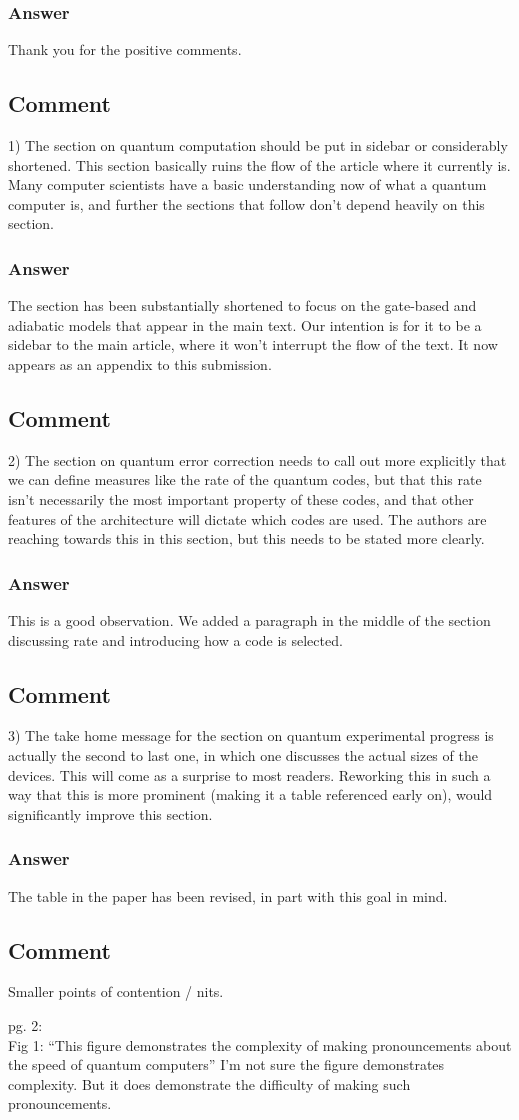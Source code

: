 \documentclass{article}
\newcommand{\comment}{\subsection{Comment}\em}
\newcommand{\answer}{\rm \subsubsection*{Answer}}
\begin{document}
\answer

Thank you for the positive comments.

\comment

1) The section on quantum computation should be put in sidebar or
considerably shortened.  This section basically ruins the flow of the
article where it currently is.  Many computer scientists have a basic
understanding now of what a quantum computer is, and further the
sections that follow don't depend heavily on this section.

\answer

The section has been substantially shortened to focus on the
gate-based and adiabatic models that appear in the main text.  Our
intention is for it to be a sidebar to the main article, where it
won't interrupt the flow of the text.  It now appears as an appendix
to this submission.

\comment

2) The section on quantum error correction needs to call out more
explicitly that we can define measures like the rate of the quantum
codes, but that this rate isn't necessarily the most important
property of these codes, and that other features of the architecture
will dictate which codes are used.  The authors are reaching towards
this in this section, but this needs to be stated more clearly.

\answer

This is a good observation.  We added a paragraph in the middle of the
section discussing rate and introducing how a code is selected.

\comment

3) The take home message for the section on quantum experimental
progress is actually the second to last one, in which one discusses
the actual sizes of the devices.  This will come as a surprise to most
readers. Reworking this in such a way that this is more prominent
(making it a table referenced early on), would significantly improve
this section.

\answer

The table in the paper has been revised, in part with this goal in
mind.

\comment


Smaller points of contention / nits.

pg. 2:\\
Fig 1: ``This figure demonstrates the complexity of making pronouncements about the speed of quantum computers''
I'm not sure the figure demonstrates complexity.  But it does demonstrate the difficulty of making such pronouncements.
\end{document}
